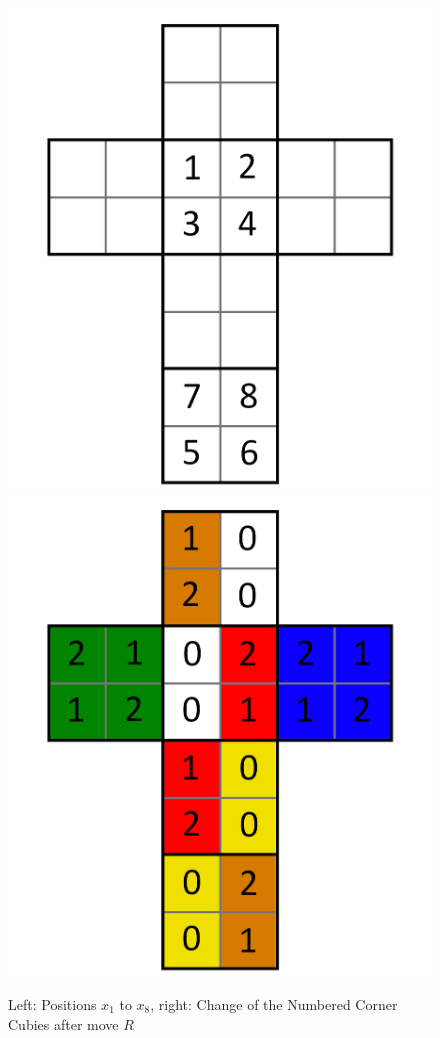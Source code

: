 \documentclass[12pt,a4paper]{article}
\theoremstyle{custom}
\begin{document}
\begin{figure}[H]
\centering
\includegraphics[scale=0.13]{foldedout_012_white.png} \hspace*{2em}
\includegraphics[scale=0.13]{foldedout_012_spin.png}
\caption[Left: $x_1$ to $x_8$, right: change after move $R$]{Left: Positions $x_1$ to $x_8$, right: Change of the Numbered Corner Cubies after move $R$}
\label{Figure_XaftermoveR}
\end{figure}
\end{document}
